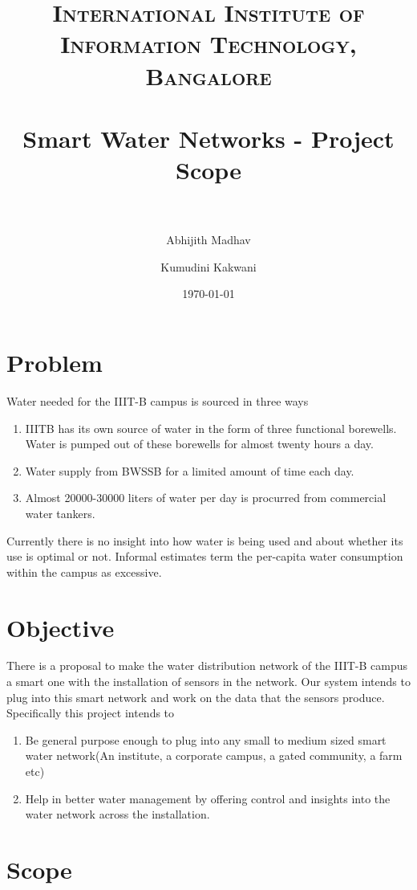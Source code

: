 \documentclass[paper=a4, fontsize=11pt]{scrartcl} %
\title{	
\normalfont \normalsize 
\textsc{International Institute of Information Technology, Bangalore} \\ [25pt] %
\horrule{0.5pt} \\[0.4cm] %
\huge Smart Water Networks - Project Scope \\ %
\horrule{2pt} \\[0.5cm] %
}
\author{Abhijith Madhav \and Kumudini Kakwani} %
\date{\normalsize\today} %
\numberwithin{equation}{section} %
\numberwithin{figure}{section} %
\numberwithin{table}{section} %
\begin{document}
\maketitle %


\section{Problem}
Water needed for the IIIT-B campus is sourced in three ways
\begin{enumerate}
\item
IIITB has its own source of water in the form of three functional borewells. Water is pumped out of these borewells for almost twenty hours a day. 
\item
Water supply from BWSSB for a limited amount of time each day.
\item
Almost 20000-30000 liters of water per day is procurred from commercial water tankers.
\end{enumerate}
Currently there is no insight into how water is being used and about whether its use is optimal or not. Informal estimates term the per-capita water consumption within the campus as excessive.

\section{Objective}
There is a proposal to make the water distribution network of the IIIT-B campus a smart one with the installation of sensors in the network. Our system intends to plug into this smart network and work on the data that the sensors produce. \\

Specifically this project intends to
\begin{enumerate}
\item
Be general purpose enough to plug into any small to medium sized smart water network(An institute, a corporate campus, a gated community, a farm etc)
\item
Help in better water management by offering control and insights into the water network across the installation.
\end{enumerate}

\section{Scope}
\end{document}
